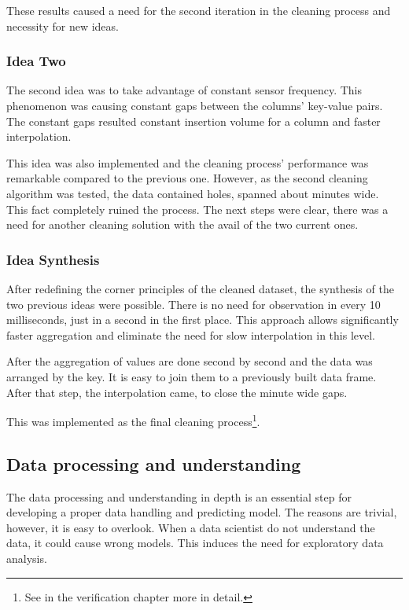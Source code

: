 		These results caused a need for the second iteration in the cleaning process and necessity for new ideas.
		\subsubsection{Idea Two}
		The second idea was to take advantage of constant sensor frequency. This phenomenon was causing constant gaps between the columns' key-value pairs. The constant gaps resulted constant insertion volume for a column and faster interpolation.

		This idea was also implemented and the cleaning process' performance was remarkable compared to the previous one. However, as the second cleaning algorithm was tested, the data contained holes, spanned about minutes wide. This fact completely ruined the process. The next steps were clear, there was a need for another cleaning solution with the avail of the two current ones.
\clearpage\subsubsection{Idea Synthesis}
		After redefining the corner principles of the cleaned dataset, the synthesis of the two previous ideas were possible.
		There is no need for observation in every 10 milliseconds, just in a second in the first place. This approach allows significantly faster aggregation and eliminate the need for slow interpolation in this level.

		After the aggregation of values are done second by second and the data was arranged by the key. It is easy to join them to a previously built data frame. After that step, the interpolation came, to close the minute wide gaps.

		This was implemented as the final cleaning process\footnote{See in the verification chapter more in detail.}.
\subsection{Data processing and understanding}
		The data processing and understanding in depth is an essential step for developing a proper data handling and predicting model.
		The reasons are trivial, however, it is easy to overlook. When a data scientist do not understand the data, it could cause wrong models. This induces the need for exploratory data analysis.
